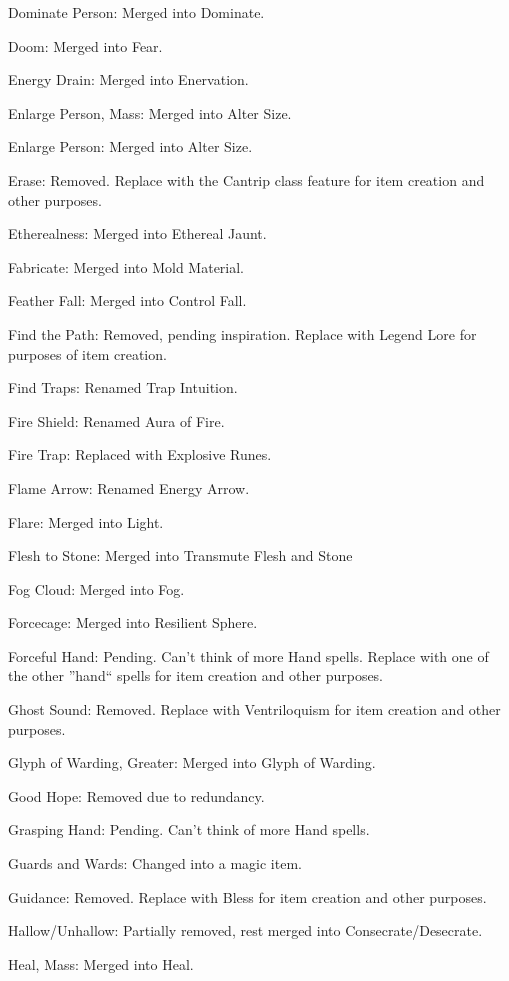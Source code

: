 {\begin{list}{}{\leftmargin=1em}
 \item Dominate Person: Merged into Dominate.
 \item Doom: Merged into Fear.
 \item Energy Drain: Merged into Enervation.
 \item Enlarge Person, Mass: Merged into Alter Size.
 \item Enlarge Person: Merged into Alter Size.
 \item Erase: Removed. Replace with the Cantrip class feature for item creation and other purposes.
 \item Etherealness: Merged into Ethereal Jaunt.
 \item Fabricate: Merged into Mold Material.
 \item Feather Fall: Merged into Control Fall.
 \item Find the Path: Removed, pending inspiration. Replace with Legend Lore for purposes of item creation.
 \item Find Traps: Renamed Trap Intuition.
 \item Fire Shield: Renamed Aura of Fire.
 \item Fire Trap: Replaced with Explosive Runes.
 \item Flame Arrow: Renamed Energy Arrow.
 \item Flare: Merged into Light.
 \item Flesh to Stone: Merged into Transmute Flesh and Stone
 \item Fog Cloud: Merged into Fog.
 \item Forcecage: Merged into Resilient Sphere.
 \item Forceful Hand: Pending. Can't think of more Hand spells. Replace with one of the other ''hand`` spells for item creation and other purposes.
 \item Ghost Sound: Removed. Replace with Ventriloquism for item creation and other purposes.
 \item Glyph of Warding, Greater: Merged into Glyph of Warding.
 \item Good Hope: Removed due to redundancy.
 \item Grasping Hand: Pending. Can't think of more Hand spells.
 \item Guards and Wards: Changed into a magic item.
 \item Guidance: Removed. Replace with Bless for item creation and other purposes.
 \item Hallow/Unhallow: Partially removed, rest merged into Consecrate/Desecrate.
 \item Heal, Mass: Merged into Heal.

\end{list}}
